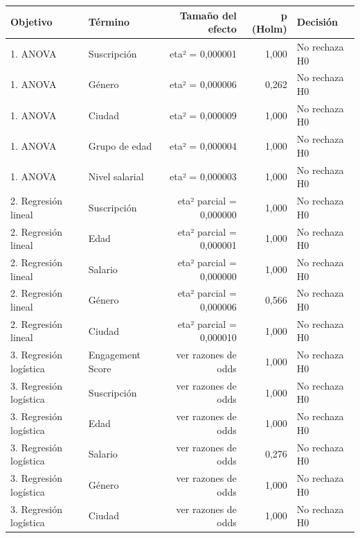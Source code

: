 \begin{tabular}{llrrl}
\toprule
Objetivo & Término & Tamaño del efecto & p (Holm) & Decisión \\
\midrule
1. ANOVA & Suscripción & eta² = 0,000001 & 1,000 & No rechaza H0 \\
1. ANOVA & Género & eta² = 0,000006 & 0,262 & No rechaza H0 \\
1. ANOVA & Ciudad & eta² = 0,000009 & 1,000 & No rechaza H0 \\
1. ANOVA & Grupo de edad & eta² = 0,000004 & 1,000 & No rechaza H0 \\
1. ANOVA & Nivel salarial & eta² = 0,000003 & 1,000 & No rechaza H0 \\
2. Regresión lineal & Suscripción & eta² parcial = 0,000000 & 1,000 & No rechaza H0 \\
2. Regresión lineal & Edad & eta² parcial = 0,000001 & 1,000 & No rechaza H0 \\
2. Regresión lineal & Salario & eta² parcial = 0,000000 & 1,000 & No rechaza H0 \\
2. Regresión lineal & Género & eta² parcial = 0,000006 & 0,566 & No rechaza H0 \\
2. Regresión lineal & Ciudad & eta² parcial = 0,000010 & 1,000 & No rechaza H0 \\
3. Regresión logística & Engagement Score & ver razones de odds & 1,000 & No rechaza H0 \\
3. Regresión logística & Suscripción & ver razones de odds & 1,000 & No rechaza H0 \\
3. Regresión logística & Edad & ver razones de odds & 1,000 & No rechaza H0 \\
3. Regresión logística & Salario & ver razones de odds & 0,276 & No rechaza H0 \\
3. Regresión logística & Género & ver razones de odds & 1,000 & No rechaza H0 \\
3. Regresión logística & Ciudad & ver razones de odds & 1,000 & No rechaza H0 \\
\bottomrule
\end{tabular}
